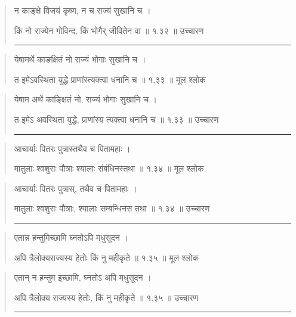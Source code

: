 \begin{quotation}

न काङ्क्षे विजयं कृष्ण, न च राज्यं सुखानि च  ।  
 
किं नो राज्येन गोविन्द, किं भोगैर् जीवितेन वा  ॥ १.३२ ॥  उच्चारण

\noindent\rule{16cm}{0.4pt} 
\end{quotation}


\begin{quotation} 

येषामर्थे काङक्षितं नो राज्यं भोगाः सुखानि च  ।  

त इमेऽवस्थिता युद्धे प्राणांस्त्यक्त्वा धनानि च  ॥ १.३३ ॥  मूल श्लोक
\end{quotation}

\begin{quotation}

येषाम अर्थे काङ्क्षितं नो, राज्यं भोगाः सुखानि च  ।  

त इमेऽ अवस्थिता युद्धे, प्राणांस्य त्यक्त्वा धनानि च  ॥ १.३३ ॥  उच्चारण

\noindent\rule{16cm}{0.4pt} 
\end{quotation}


\begin{quotation} 

आचार्याः पितरः पुत्रास्तथैव च पितामहाः  ।  
 
मातुलाः श्वशुराः पौत्राः श्यालाः संबंधिनस्तथा  ॥ १.३४ ॥  मूल श्लोक
\end{quotation}

\begin{quotation}

आचार्याः पितरः पुत्रास्, तथैव च पितामहाः ।  

मातुलाः श्वशुराः पौत्राः, श्यालाः सम्बन्धिनस तथा  ॥ १.३४ ॥  उच्चारण

\noindent\rule{16cm}{0.4pt} 
\end{quotation}


\begin{quotation} 

एतान्न हन्तुमिच्छामि घ्नतोऽपि मधुसूदन  ।  
 
अपि त्रैलोक्यराज्यस्य हेतोः किं नु महीकृते  ॥ १.३५ ॥  मूल श्लोक
\end{quotation}

\begin{quotation}

एतान् न हन्तुम इच्छामि, घ्नतोऽ अपि मधुसूदन ।  

अपि त्रैलोक्य राज्यस्य हेतोः, किं नु महीकृते  ॥ १.३५ ॥   उच्चारण

\noindent\rule{16cm}{0.4pt} 
\end{quotation}


